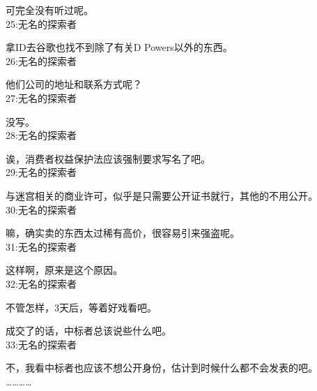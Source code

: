 可完全没有听过呢。\\

25:无名的探索者

拿ID去谷歌也找不到除了有关D Powers以外的东西。\\

26:无名的探索者

他们公司的地址和联系方式呢？\\

27:无名的探索者

没写。\\

28:无名的探索者

诶，消费者权益保护法应该强制要求写名了吧。\\

29:无名的探索者

与迷宫相关的商业许可，似乎是只需要公开证书就行，其他的不用公开。\\

30:无名的探索者

嘛，确实卖的东西太过稀有高价，很容易引来强盗呢。\\

31:无名的探索者

这样啊，原来是这个原因。\\

32:无名的探索者

不管怎样，3天后，等着好戏看吧。

成交了的话，中标者总该说些什么吧。\\

33:无名的探索者

不，我看中标者也应该不想公开身份，估计到时候什么都不会发表的吧。\\

…………
